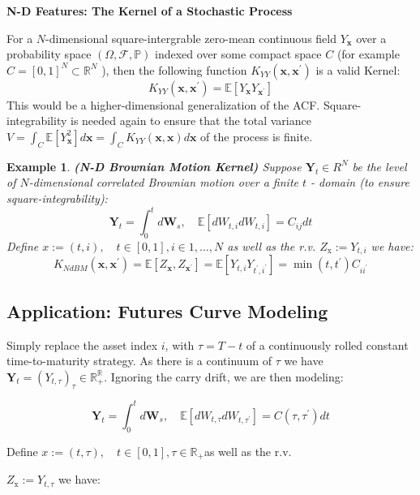 \documentclass[11pt]{article}
\theoremstyle{plain} %
\newtheorem{example}[theorem]{Example}
\theoremstyle{remark}
\begin{document}
\textbf{N-D Features: The Kernel of a Stochastic Process}

For a $N$-dimensional square-intergrable zero-mean continuous field
$Y_{\mathbf{x}}$ over a probability space $(\Omega, \mathcal{F}, \mathbb{P})$ indexed over
some compact space $C$ (for example $C=[0,1]^{N} \subset \mathbb{R}^{N}$ ), then
the following function $K_{Y Y}\left(\mathbf{x}, \mathbf{x}^{\prime}\right)$ is a
valid Kernel:
$$
  K_{Y Y}\left(\mathbf{x}, \mathbf{x}^{\prime}\right)=\mathbb{E}\left[Y_{\mathbf{x}} Y_{\mathbf{x}^{\prime}}\right]
$$
This would be a higher-dimensional generalization of the ACF.
Square-integrability is needed again to ensure that the total variance
$V=\int_{C} \mathbb{E}\left[Y_{\mathbf{x}}^{2}\right] d \mathbf{x}=\int_{C} K_{Y
      Y}(\mathbf{x}, \mathbf{x}) d \mathbf{x}$ of the process is finite.

\begin{example}
  \textbf{(N-D Brownian Motion Kernel)} Suppose $\mathbf{Y}_{t} \in R^{N}$ be
  the level of $N$-dimensional correlated Brownian motion over a finite $t$ -
  domain (to ensure square-integrability):
  $$
    \mathbf{Y}_{t}=\int_{0}^{t} d \mathbf{W}_{s}, \quad \mathbb{E}\left[d W_{t, i} d W_{t, i}\right]=C_{i j} d t
  $$
  Define $x:=(t, i), \quad t \in[0,1], i \in 1, \ldots, N$ as well as the r.v.
  $Z_{\mathrm{x}}:=Y_{t, i}$ we have:
  $$
    K_{N d B M}\left(\mathbf{x}, \mathbf{x}^{\prime}\right)=\mathbb{E}\left[Z_{\mathbf{x}}, Z_{\mathbf{x}^{\prime}}\right]=\mathbb{E}\left[Y_{t, i} Y_{t^{\prime}, i^{\prime}}\right]=\min \left(t, t^{\prime}\right) C_{i i^{\prime}}
  $$
\end{example}

\subsection{Application: Futures Curve Modeling}
Simply replace the asset index $i$, with $\tau=T-t$ of a continuously rolled
constant time-to-maturity strategy. As there is a continuum of $\tau$ we have
$\mathbf{Y}_{t}=\left(Y_{t, \tau}\right)_{\tau} \in
  \mathbb{R}_{+}^{\mathbb{R}}$. Ignoring the carry drift, we are then modeling:

$$
  \mathbf{Y}_{t}=\int_{0}^{t} d \mathbf{W}_{s}, \quad \mathbb{E}\left[d W_{t, \tau} d W_{t, \tau^{\prime}}\right]=C\left(\tau, \tau^{\prime}\right) d t
$$

Define $x:=(t, \tau), \quad t \in[0,1], \tau \in \mathbb{R}_{+}$as well as the
r.v.

$Z_{\mathrm{x}}:=Y_{t, \tau}$ we have:
\end{document}
